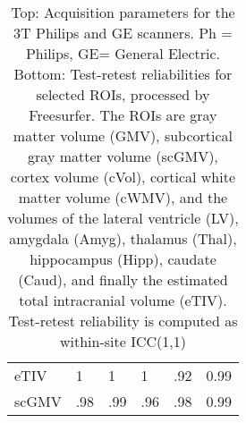 \begin{table}
{\begin{tabular}{llllll}
eTIV                  &                   1 &                        1 &                  1 &               .92 &                 0.99 \\
scGMV                 &                   .98 &                        .99 &                  .96 &               .98 &                 0.99 \\
\bottomrule
\end{tabular}}
\fi
\caption{Top: Acquisition parameters for the 3T Philips and GE scanners. Ph = Philips, GE= General Electric. Bottom: Test-retest reliabilities for selected ROIs, processed by Freesurfer. The ROIs are gray matter volume (GMV), subcortical gray matter volume (scGMV), cortex volume (cVol), cortical white matter volume (cWMV), and the volumes of the lateral ventricle (LV), amygdala (Amyg), thalamus (Thal), hippocampus (Hipp), caudate (Caud), and finally the estimated total intracranial volume (eTIV). Test-retest reliability is computed as within-site ICC(1,1)} 
\label{tab:acquisition1}

\end{table}